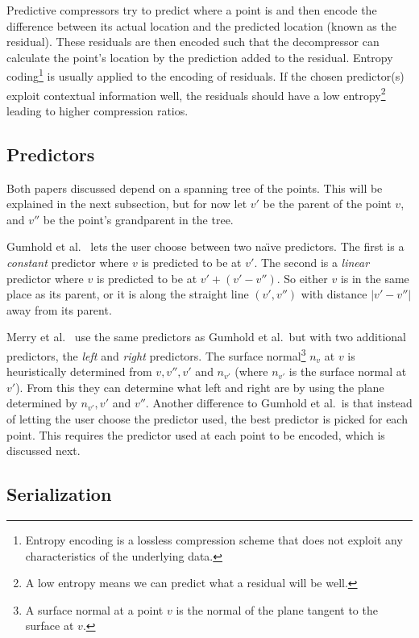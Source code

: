 \documentclass{report}
\begin{document}
Predictive compressors try to predict where a point is and then encode the
difference between its actual location and the predicted location (known as
the residual). These residuals are then encoded such that the decompressor can
calculate the point's location by the prediction added to the
residual. Entropy coding\footnote{Entropy encoding is a lossless compression
  scheme that does not exploit any characteristics of the underlying data.} is
usually applied to the encoding of residuals. If the chosen predictor(s)
exploit contextual information well, the residuals should have a low
entropy\footnote{A low entropy means we can predict what a residual will be
  well.}  leading to higher compression ratios.


\subsection{Predictors}

Both papers discussed depend on a spanning tree of the points. This will be
explained in the next subsection, but for now let $v'$ be the parent of the
point $v$, and $v''$ be the point's grandparent in the tree.

Gumhold et al.~\cite{gumholdcomp} lets the user choose between two na\"{\i}ve
predictors. The first is a \emph{constant} predictor where $v$ is predicted to
be at $v'$. The second is a \emph{linear} predictor where $v$ is predicted to
be at $v' + (v' - v'')$. So either $v$ is in the same place as its parent, or
it is along the straight line $(v', v'')$ with distance $|v'-v''|$ away from
its parent.

Merry et al.~\cite{merrycomp} use the same predictors as Gumhold et al.\ but
with two additional predictors, the \emph{left} and \emph{right}
predictors. The surface normal\footnote{A surface normal at a point $v$ is the
  normal of the plane tangent to the surface at $v$.} $n_v$ at $v$ is
heuristically determined from $v, v'', v'$ and $n_{v'}$ (where $n_{v'}$ is the
surface normal at $v'$). From this they can determine what left and right are
by using the plane determined by $n_{v'}, v'$ and $v''$. Another difference to
Gumhold et al.\ is that instead of letting the user choose the predictor used,
the best predictor is picked for each point. This requires the predictor used
at each point to be encoded, which is discussed next.


\subsection{Serialization}
\end{document}
